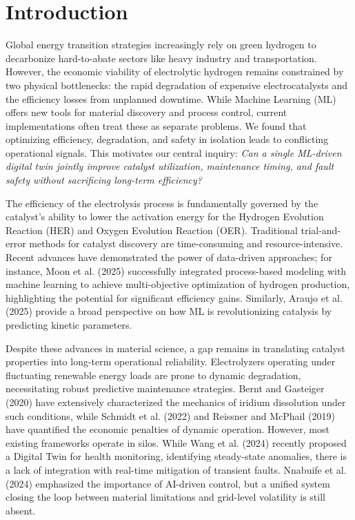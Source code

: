 \documentclass[preprint,12pt]{elsarticle}
\begin{document}
\section{Introduction}

Global energy transition strategies increasingly rely on green hydrogen to decarbonize hard-to-abate sectors like heavy industry and transportation. However, the economic viability of electrolytic hydrogen remains constrained by two physical bottlenecks: the rapid degradation of expensive electrocatalysts and the efficiency losses from unplanned downtime. While Machine Learning (ML) offers new tools for material discovery and process control, current implementations often treat these as separate problems. We found that optimizing efficiency, degradation, and safety in isolation leads to conflicting operational signals. This motivates our central inquiry: \textit{Can a single ML-driven digital twin jointly improve catalyst utilization, maintenance timing, and fault safety without sacrificing long-term efficiency?}

The efficiency of the electrolysis process is fundamentally governed by the catalyst's ability to lower the activation energy for the Hydrogen Evolution Reaction (HER) and Oxygen Evolution Reaction (OER). Traditional trial-and-error methods for catalyst discovery are time-consuming and resource-intensive. Recent advances have demonstrated the power of data-driven approaches; for instance, Moon et al. (2025) \cite{moon2025} successfully integrated process-based modeling with machine learning to achieve multi-objective optimization of hydrogen production, highlighting the potential for significant efficiency gains. Similarly, Araujo et al. (2025) \cite{araujo2025} provide a broad perspective on how ML is revolutionizing catalysis by predicting kinetic parameters.

Despite these advances in material science, a gap remains in translating catalyst properties into long-term operational reliability. Electrolyzers operating under fluctuating renewable energy loads are prone to dynamic degradation, necessitating robust predictive maintenance strategies. Bernt and Gasteiger (2020) \cite{gasteiger2020} have extensively characterized the mechanics of iridium dissolution under such conditions, while Schmidt et al. (2022) \cite{schmidt2022} and Reissner and McPhail (2019) \cite{mcphail2019} have quantified the economic penalties of dynamic operation. However, most existing frameworks operate in silos. While Wang et al. (2024) \cite{wang2024} recently proposed a Digital Twin for health monitoring, identifying steady-state anomalies, there is a lack of integration with real-time mitigation of transient faults. Nnabuife et al. (2024) \cite{nnabuife2024} emphasized the importance of AI-driven control, but a unified system closing the loop between material limitations and grid-level volatility is still absent.
\end{document}
